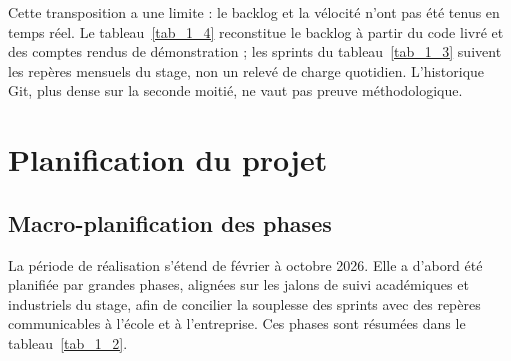 \documentclass[]{./tpl/isipfe}
\begin{document}
Cette transposition a une limite : le backlog et la vélocité n’ont pas été tenus en temps réel. Le tableau~\ref{tab_1_4} reconstitue le backlog à partir du code livré et des comptes rendus de démonstration ; les sprints du tableau~\ref{tab_1_3} suivent les repères mensuels du stage, non un relevé de charge quotidien. L’historique Git, plus dense sur la seconde moitié, ne vaut pas preuve méthodologique.

\section{Planification du projet}
\label{sec_1_8}
\subsection{Macro-planification des phases}
\label{sec_1_8_1}
La période de réalisation s’étend de février à octobre 2026. Elle a d’abord été planifiée par grandes phases, alignées sur les jalons de suivi académiques et industriels du stage, afin de concilier la souplesse des sprints avec des repères communicables à l’école et à l’entreprise. Ces phases sont résumées dans le tableau~\ref{tab_1_2}.
\end{document}
